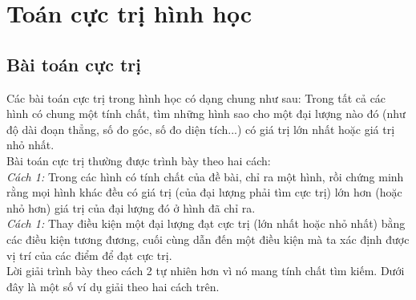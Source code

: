 \section{Toán cực trị hình học}
\subsection{Bài toán cực trị}
Các bài toán cực trị trong hình học có dạng chung như sau: Trong tất cả các hình có chung một tính chất, tìm những hình sao cho một đại lượng nào đó (như độ dài đoạn thẳng, số đo góc, số đo diện tích...) có giá trị lớn nhất hoặc giá trị nhỏ nhất.\\
Bài toán cực trị thường được trình bày theo hai cách:\\
\textit{Cách 1:} Trong các hình có tính chất của đề bài, chỉ ra một hình, rồi chứng minh rằng mọi hình khác đều có giá trị (của đại lượng phải tìm cực trị) lớn hơn (hoặc nhỏ hơn) giá trị của đại lượng đó ở hình đã chỉ ra.\\
\textit{Cách 1:} Thay điều kiện một đại lượng đạt cực trị (lớn nhất hoặc nhỏ nhất) bằng các điều kiện tương đương, cuối cùng dẫn đến một điều kiện mà ta xác định được vị trí của các điểm để đạt cực trị.\\
Lời giải trình bày theo cách 2 tự nhiên hơn vì nó mang tính chất tìm kiếm. Dưới đây là một số ví dụ giải theo hai cách trên.

